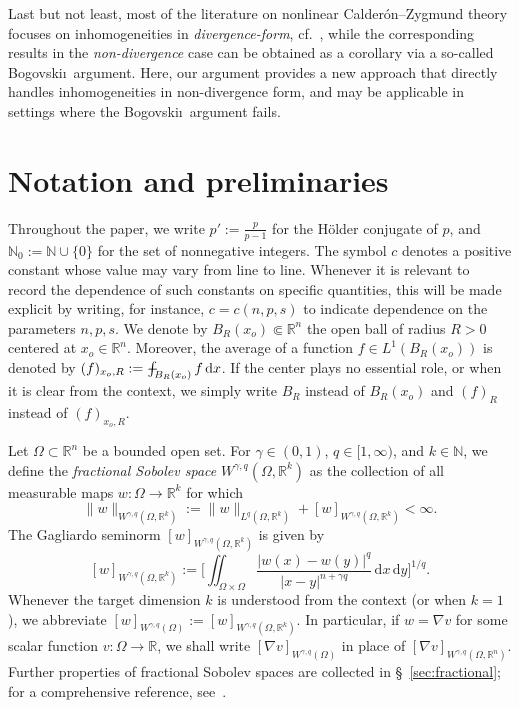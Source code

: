 \documentclass[10pt,letterpaper]{amsart}
\theoremstyle{definition}
\numberwithin{theorem}{section}
\numberwithin{equation}{section}
\newcommand{\tmint}{- \mskip-16,5mu \int}
\newcommand{\1}{\ensuremath{\mathds{1}}}
\newcommand{\dx}{\mathrm{d}x}
\numberwithin{equation}{section}
\begin{document}
Last but not least, most of the literature on nonlinear Calderón–Zygmund theory focuses on inhomogeneities in {\it divergence-form}, cf.~\cite{AcMi, CP-98, DiBe-Man, Iwaniecz, Ki-Zh}, while the corresponding results in the {\it non-divergence} case can be obtained as a corollary via a so-called Bogovski\i\ argument.
Here, our argument provides a new approach that directly handles
inhomogeneities in non-divergence form, and may be applicable in
settings where the Bogovski\i\ argument fails.



\section{Notation and preliminaries}\label{S:notation}

\noindent
Throughout the paper, we write \(p' := \tfrac{p}{p-1}\) for the H\"older conjugate of \(p\), and \(\mathbb{N}_0 := \mathbb{N}\cup\{0\}\) for the set of nonnegative integers. 
The symbol \(c\) denotes a positive constant whose value may vary from line to line. 
Whenever it is relevant to record the dependence of such constants on specific quantities, this will be made explicit by writing, for instance, \(c=c(n,p,s)\) to indicate dependence on the parameters \(n,p,s\). 
We denote by \(B_R(x_o)\Subset\mathbb{R}^n\) the open ball of radius \(R>0\) centered at \(x_o\in\mathbb{R}^n\). Moreover, the average of a function $f\in L^1(B_R(x_o))$ is denoted by $(f)_{x_o,R}:=\tmint_{B_R(x_o)} f\,\dx$. 
If the center plays no essential role, or when it is clear from the context, we simply write \(B_R\) instead of \(B_R(x_o)\) and $(f)_{R}$ instead of $(f)_{x_o,R}$.


Let $\Omega\subset\mathbb{R}^n$ be a bounded open set. 
For $\gamma\in(0,1)$, $q\in[1,\infty)$, and $k\in\mathbb{N}$, we define the \emph{fractional Sobolev space} $W^{\gamma,q}(\Omega,\mathbb{R}^k)$ as the collection of all measurable maps $w\colon\Omega\to\mathbb{R}^k$ for which
\[
    \|w\|_{W^{\gamma,q}(\Omega,\mathbb{R}^k)}
    := 
    \|w\|_{L^q(\Omega,\mathbb{R}^k)} 
    + [w]_{W^{\gamma,q}(\Omega,\mathbb{R}^k)}
    <\infty.
\]
The Gagliardo seminorm $[w]_{W^{\gamma,q}(\Omega,\mathbb{R}^k)}$ is given by
\[
    [w]_{W^{\gamma,q}(\Omega,\mathbb{R}^k)}
    :=
    \biggl[
    \iint_{\Omega\times\Omega}
    \frac{|w(x)-w(y)|^q}{|x-y|^{n+\gamma q}}\,\mathrm{d}x\,\mathrm{d}y
    \biggr]^{1/q}.
\]
Whenever the target dimension $k$ is understood from the context (or when $k=1$), we abbreviate
$[w]_{W^{\gamma,q}(\Omega)} := [w]_{W^{\gamma,q}(\Omega,\mathbb{R}^k)}$.  
In particular, if $w=\nabla v$ for some scalar function $v\colon\Omega\to\mathbb{R}$, we shall write 
$[\nabla v]_{W^{\gamma,q}(\Omega)}$ in place of 
$[\nabla v]_{W^{\gamma,q}(\Omega,\mathbb{R}^n)}$.  
Further properties of fractional Sobolev spaces are collected in \S~\ref{sec:fractional}; for a comprehensive reference, see~\cite{Hitchhikers-guide}.
\end{document}
